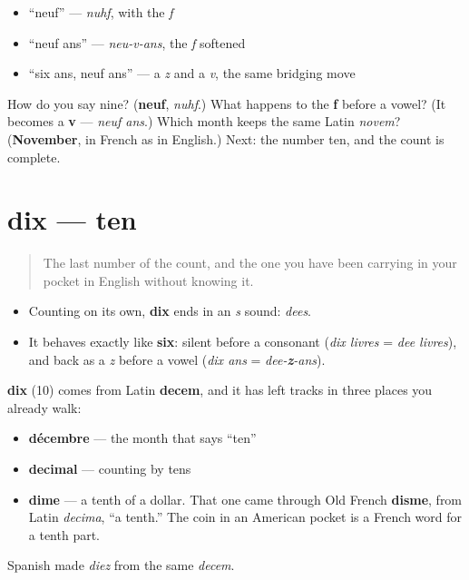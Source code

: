 \begin{itemize}
\raggedright
  \item \textquotedblleft{}neuf\textquotedblright{} — \emph{nuhf}, with the \emph{f}
  \item \textquotedblleft{}neuf ans\textquotedblright{} — \emph{neu-v-ans}, the \emph{f} softened
  \item \textquotedblleft{}six ans, neuf ans\textquotedblright{} — a \emph{z} and a \emph{v}, the same bridging move
\end{itemize}

\begin{tcolorbox}[breakable,colback=teal!4,colframe=teal!35!black,title={Before you move on}]
How do you say nine? (\textbf{neuf}, \emph{nuhf}.) What happens to the \textbf{f} before a vowel? (It becomes a \textbf{v} — \emph{neuf ans}.) Which month keeps the same Latin \emph{novem}? (\textbf{November}, in French as in English.) Next: the number ten, and the count is complete.
\end{tcolorbox}
\section[dix]{dix — ten}

\label{lesson:FR-C06-dix}



\begin{quote}
The last number of the count, and the one you have been carrying in your pocket in English without knowing it.
\end{quote}

\begin{sounds}
\begin{itemize}
\raggedright
  \item Counting on its own, \textbf{dix} ends in an \emph{s} sound: \emph{dees}.
  \item It behaves exactly like \textbf{six}: silent before a consonant (\emph{dix livres} = \emph{dee livres}), and back as a \emph{z} before a vowel (\emph{dix ans} = \emph{dee-\textbf{z}-ans}).
\end{itemize}
\end{sounds}

\begin{cousinweb}
\textbf{dix} (10) comes from Latin \textbf{decem}, and it has left tracks in three places you already walk:

\begin{itemize}
\raggedright
  \item \textbf{décembre} — the month that says \textquotedblleft{}ten\textquotedblright{}
  \item \textbf{decimal} — counting by tens
  \item \textbf{dime} — a tenth of a dollar. That one came through Old French \textbf{disme}, from Latin \emph{decima}, \textquotedblleft{}a tenth.\textquotedblright{} The coin in an American pocket is a French word for a tenth part.
\end{itemize}

Spanish made \emph{diez} from the same \emph{decem}.
\end{cousinweb}

